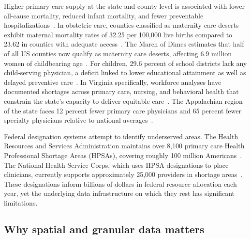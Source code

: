 \documentclass{CUP-JNL-DAP}%
\begin{document}
Higher primary care supply at the state and county level is associated with lower all-cause mortality, reduced infant mortality, and fewer preventable hospitalizations~\citep{starfield2005}. In obstetric care, counties classified as maternity care deserts exhibit maternal mortality rates of 32.25 per 100,000 live births compared to 23.62 in counties with adequate access~\citep{atwani2025}. The March of Dimes estimates that half of all US counties now qualify as maternity care deserts, affecting 6.9 million women of childbearing age~\citep{marchofdimes2024}. For children, 29.6 percent of school districts lack any child-serving physician, a deficit linked to lower educational attainment as well as delayed preventive care~\citep{drescher2023}. In Virginia specifically, workforce analyses have documented shortages across primary care, nursing, and behavioral health that constrain the state's capacity to deliver equitable care~\citep{andrew2024}. The Appalachian region of the state faces 12 percent fewer primary care physicians and 65 percent fewer specialty physicians relative to national averages~\citep{marshall2017}.

Federal designation systems attempt to identify underserved areas. The Health Resources and Services Administration maintains over 8,100 primary care Health Professional Shortage Areas (HPSAs), covering roughly 100 million Americans~\citep{hrsa2024}. The National Health Service Corps, which uses HPSA designations to place clinicians, currently supports approximately 25,000 providers in shortage areas~\citep{crs2023}. These designations inform billions of dollars in federal resource allocation each year, yet the underlying data infrastructure on which they rest has significant limitations.

\subsection{Why spatial and granular data matters}
\end{document}
